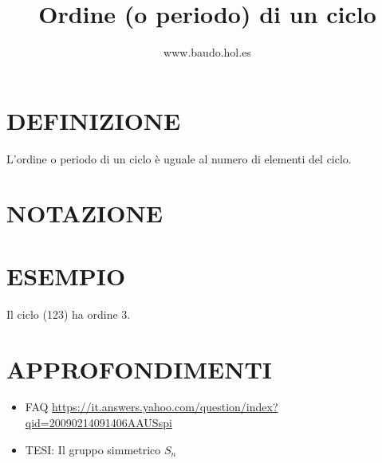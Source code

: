 \documentclass[a4paper,10pt]{article}
\title{Ordine (o periodo) di un ciclo}
\author{www.baudo.hol.es}
\begin{document}
\maketitle

\section{DEFINIZIONE}
L'ordine o periodo di un ciclo è uguale al numero di elementi del ciclo.

\section{NOTAZIONE}

\section{ESEMPIO}
Il ciclo (123) ha ordine 3.

\section{APPROFONDIMENTI}
\begin{itemize}
 \item FAQ \href{https://it.answers.yahoo.com/question/index?qid=20090214091406AAUSspi}{https://it.answers.yahoo.com/question/index?qid=20090214091406AAUSspi}
 \item TESI: Il gruppo simmetrico $S_n$ \cite{simmetrico1}
\end{itemize}



\end{document}

